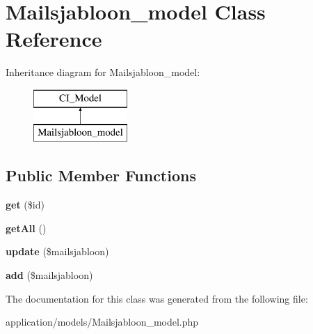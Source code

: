 \hypertarget{class_mailsjabloon__model}{}\section{Mailsjabloon\+\_\+model Class Reference}
\label{class_mailsjabloon__model}
Inheritance diagram for Mailsjabloon\+\_\+model\+:\begin{figure}[H]
\begin{center}
\leavevmode
\includegraphics[height=2.000000cm]{class_mailsjabloon__model}
\end{center}
\end{figure}
\subsection*{Public Member Functions}
\begin{DoxyCompactItemize}
\item 
\mbox{\label{class_mailsjabloon__model_a2fd2620c0951e3b9954e557652b74ff0}} 
{\bfseries get} (\$id)
\item 
\mbox{\label{class_mailsjabloon__model_a6723ec4f9fa1a3f1195f93f0c9326239}} 
{\bfseries get\+All} ()
\item 
\mbox{\label{class_mailsjabloon__model_a4272406d2eee5775d951d5320d0618aa}} 
{\bfseries update} (\$mailsjabloon)
\item 
\mbox{\label{class_mailsjabloon__model_ac8906f2f6b9aedabd697ab35ce11e407}} 
{\bfseries add} (\$mailsjabloon)
\end{DoxyCompactItemize}


The documentation for this class was generated from the following file\+:\begin{DoxyCompactItemize}
\item 
application/models/Mailsjabloon\+\_\+model.\+php\end{DoxyCompactItemize}
